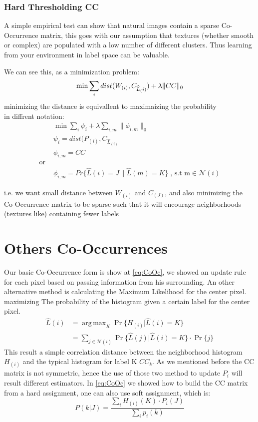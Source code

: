 \documentclass{article}
\DeclareMathOperator*{\argmax}{arg\,max}
\begin{document}
\subsubsection{Hard Thresholding CC}
A simple empirical test can show that natural images contain a sparse Co-Occurrence  matrix, this goes with our assumption that textures (whether smooth or complex) are populated with a low number of different clusters. Thus learning from your environment in label space can be valuable.

We can see this, as a minimization problem:
\begin{equation}
\min\sum_i dist(W_{(i)},C_{\widehat L_(i)})+\lambda\lVert CC\rVert_0 \label{eq:minimizer}\\
\end{equation}
minimizing the distance is equivallent to maximaizing the probability\\
in diffrent notation:
\begin{align}
&\min\sum_i \psi_i +\lambda\sum_{i,m}\lVert\phi_{i,m}\rVert_0 \\
&\psi_i=dist(P_{(i)},C_{\hat L_(i)} \nonumber\\
&\phi_{i,m}=CC\nonumber \\
\text{or  } \nonumber\\
&\phi_{i,m}=Pr\{\hat L(i)=J\|\hat L(m)=K\}\;\text{,  s.t m}\in \mathcal{N}(i)\nonumber
\end{align}

i.e. we want small distance between $W_{(i)}$ and $C_{(J)}$, and also minimizing the Co-Occurrence matrix to be sparse such that it will encourage neighborhoods (textures like) containing fewer labels

\section{Others Co-Occurrences}

Our basic Co-Occurrence form is show at \eqref{eq:CoOc}, we showed an update rule for each pixel based on passing information from his surrounding.
An other alternative method is calculating the Maximum Likelihood for the center pixel. maximizing The probability of the histogram given a certain label for the center pixel.
\begin{align}
\widehat{L}(i)&=\argmax_K \Pr \{H_{(i)}|\widehat{L}(i)=K \}\\
&=\sum_{j\in\mathcal{N}(i)}^{} \Pr \{\widehat{L}(j)|\widehat{L}(i)=K \}\cdot \Pr \{j\}\nonumber
\end{align}
This result a simple correlation distance between the neighborhood histogram $ H_{(i)} $ and the typical histogram for label K $ CC_k $.
As we mentioned before the CC matrix is not symmetric, hence the use of those two method to update $ P_{i} $ will result different estimators.
In \eqref{eq:CoOc} we showed how to build the CC matrix from a hard assignment, one can also use soft assignment, which is:
\begin{equation}
P(k|J)=\frac{\sum_{i}H_{(i)}(K)\cdot P_i(J)}{\sum_{i} p_i(k)}
\end{equation} 
\end{document}
